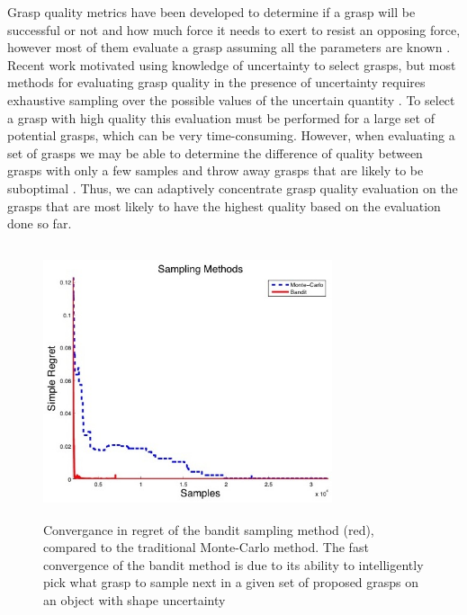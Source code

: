 \documentclass[letterpaper, 10 pt, conference]{ieeeconf}  %
\begin{document}
Grasp quality metrics have been developed to determine if a grasp will be successful or not and how much force it needs to exert to resist an opposing force, however most of them evaluate a grasp assuming all the parameters are known \cite{ferrari1992}.
Recent work motivated using knowledge of uncertainty to select grasps, but most methods for evaluating grasp quality in the presence of uncertainty requires exhaustive sampling over the possible values of the uncertain quantity \cite{kim2012physically, weisz2012pose}.
To select a grasp with high quality this evaluation must be performed for a large set of potential grasps, which can be very time-consuming.
However, when evaluating a set of grasps we may be able to determine the difference of quality between grasps with only a few samples and throw away grasps that are likely to be suboptimal \cite{kehoe2012estimating}.
Thus, we can adaptively concentrate grasp quality evaluation on the grasps that are most likely to have the highest quality based on the evaluation done so far.

\begin{figure}[t!]
\centering
\includegraphics[width=8.5cm,height=8cm]{figures/Slide02.jpg}
\caption{\footnotesize
Convergance in regret of the bandit sampling method (red), compared to the traditional Monte-Carlo method. The fast convergence of the bandit method is due to its ability to intelligently pick what grasp to sample next in a given set of proposed grasps on an object with shape uncertainty}
\vspace*{-10pt}
\label{fig:noisy data}
\end{figure}
\end{document}
